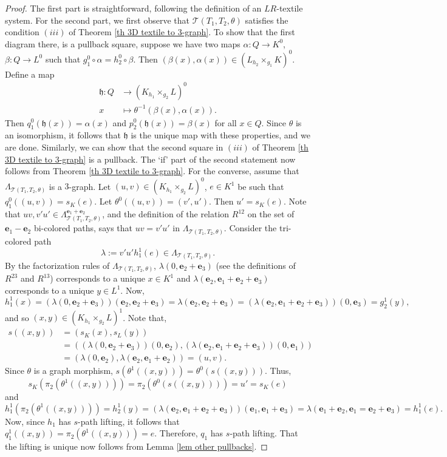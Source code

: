 \documentclass[a4paper,reqno,12pt]{amsart}
\newcommand{\ea}{\mathbf{e}_1}
\newcommand{\eb}{\mathbf{e}_2}
\newcommand{\ec}{\mathbf{e}_3}
\theoremstyle{definition}
\theoremstyle{remark}
\begin{document}
\begin{proof}
The first part is straightforward, following the definition of an $LR$-textile system. For the second part, we first observe that $\mathcal{T}(T_1,T_2,\theta)$ satisfies the condition $(iii)$ of Theorem \ref{th 3D textile to 3-graph}. To show that the first diagram there, is a pullback square, suppose we have two maps $\alpha:Q\longrightarrow K^0$, $\beta:Q\longrightarrow L^0$ such that $g_1^0\circ \alpha=h_2^0\circ \beta$. Then $(\beta(x),\alpha(x))\in (L{{}_{h_2}\times_{g_1}}K)^0$. Define a map 
\begin{align*}
    \mathfrak{h}:Q &\longrightarrow (K{{}_{h_1}\times_{g_2}}L)^0\\
    x &\longmapsto \theta^{-1}(\beta(x),\alpha(x)).
\end{align*}
Then $q_1^0(\mathfrak{h}(x))=\alpha(x)$ and $p_2^0(\mathfrak{h}(x))=\beta(x)$ for all $x\in Q$. Since $\theta$ is an isomorphism, it follows that $\mathfrak{h}$ is the unique map with these properties, and we are done. Similarly, we can show that the second square in $(iii)$ of Theorem \ref{th 3D textile to 3-graph} is a pullback. The `if' part of the second statement now follows from Theorem \ref{th 3D textile to 3-graph}. For the converse, assume that $\Lambda_{\mathcal{T}(T_1,T_2,\theta)}$ is a $3$-graph. Let $(u,v)\in (K{{}_{h_1}\times_{g_2}}L)^0$, $e\in K^1$ be such that $q_1^0((u,v))=s_{K}(e)$. Let $\theta^0((u,v))=(v',u')$. Then $u'=s_K(e)$. Note that $uv,v'u'\in \Lambda_{\mathcal{T}(T_1,T_2,\theta)}^{\ea+\eb}$, and the definition of the relation $R^{12}$ on the set of $\ea-\eb$ bi-colored paths, says that $uv=v'u'$ in $\Lambda_{\mathcal{T}(T_1,T_2,\theta)}$. Consider the tri-colored path \[\lambda:=v'u'h_1^1(e)\in \Lambda_{\mathcal{T}(T_1,T_2,\theta)}.\] By the factorization rules of $\Lambda_{\mathcal{T}(T_1,T_2,\theta)}$, $\lambda(0,\eb+\ec)$ (see the definitions of $R^{23}$ and $R^{13}$) corresponds to a unique $x\in K^1$ and $\lambda(\eb,\ea+\eb+\ec)$ corresponds to a unique $y\in L^1$. Now, \[h_1^1(x)=(\lambda(0,\eb+\ec))(\eb,\eb+\ec)=\lambda(\eb,\eb+\ec)=(\lambda(\eb,\ea+\eb+\ec))(0,\ec)=g_2^1(y),\] and so $(x,y)\in (K{{}_{h_1}\times_{g_2}}L)^1$. Note that,
\begin{align*}
s((x,y))&=(s_K(x),s_L(y))\\
&=((\lambda(0,\eb+\ec))(0,\eb),(\lambda(\eb,\ea+\eb+\ec))(0,\ea))\\
&=(\lambda(0,\eb),\lambda(\eb,\ea+\eb))=(u,v).
\end{align*}
Since $\theta$ is a graph morphism, $s(\theta^1((x,y)))=\theta^0(s((x,y)))$. Thus, \[s_K(\pi_2(\theta^1((x,y))))=\pi_2(\theta^0(s((x,y))))=u'=s_K(e)\] and \[h_1^1(\pi_2(\theta^1((x,y))))=h_2^1(y)=(\lambda(\eb,\ea+\eb+\ec))(\ea,\ea+\ec)=\lambda(\ea+\eb,\ea=\eb+\ec)=h_1^1(e).\] Now, since $h_1$ has $s$-path lifting, it follows that $q_1^1((x,y))=\pi_2(\theta^1((x,y)))=e$. Therefore, $q_1$ has $s$-path lifting. That the lifting is unique now follows from Lemma \ref{lem other pullbacks}.
\end{proof}
\end{document}
